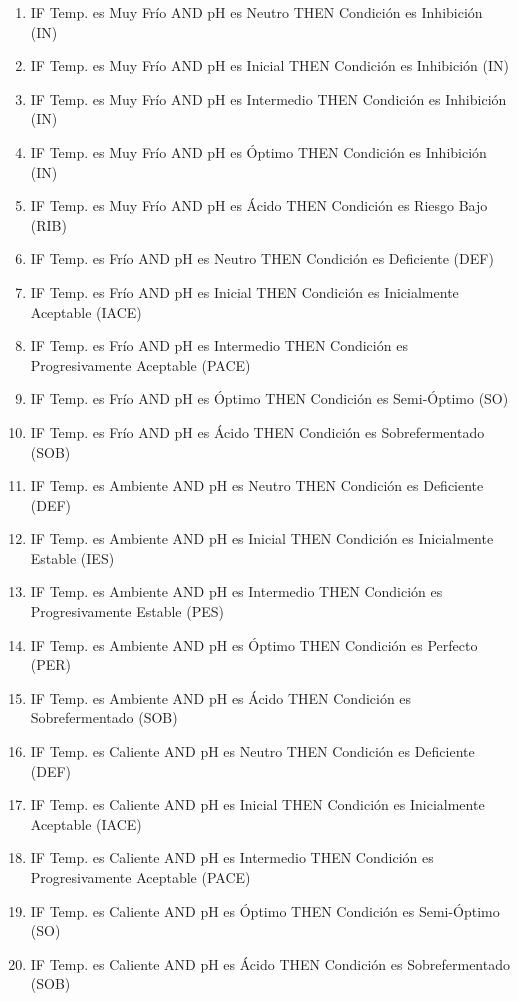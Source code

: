 \begin{enumerate}

\item IF Temp. es Muy Frío AND pH es Neutro THEN Condición es Inhibición (IN)
\item IF Temp. es Muy Frío AND pH es Inicial THEN Condición es Inhibición (IN)
\item IF Temp. es Muy Frío AND pH es Intermedio THEN Condición es Inhibición (IN)
\item IF Temp. es Muy Frío AND pH es Óptimo THEN Condición es Inhibición (IN)
\item IF Temp. es Muy Frío AND pH es Ácido THEN Condición es Riesgo Bajo (RIB)

\item IF Temp. es Frío AND pH es Neutro THEN Condición es Deficiente (DEF)
\item IF Temp. es Frío AND pH es Inicial THEN Condición es Inicialmente Aceptable (IACE)
\item IF Temp. es Frío AND pH es Intermedio THEN Condición es Progresivamente Aceptable (PACE)
\item IF Temp. es Frío AND pH es Óptimo THEN Condición es Semi-Óptimo (SO)
\item IF Temp. es Frío AND pH es Ácido THEN Condición es Sobrefermentado (SOB)

\item IF Temp. es Ambiente AND pH es Neutro THEN Condición es Deficiente (DEF)
\item IF Temp. es Ambiente AND pH es Inicial THEN Condición es Inicialmente Estable (IES)
\item IF Temp. es Ambiente AND pH es Intermedio THEN Condición es Progresivamente Estable (PES)
\item IF Temp. es Ambiente AND pH es Óptimo THEN Condición es Perfecto (PER)
\item IF Temp. es Ambiente AND pH es Ácido THEN Condición es Sobrefermentado (SOB)

\item IF Temp. es Caliente AND pH es Neutro THEN Condición es Deficiente (DEF)
\item IF Temp. es Caliente AND pH es Inicial THEN Condición es Inicialmente Aceptable (IACE)
\item IF Temp. es Caliente AND pH es Intermedio THEN Condición es Progresivamente Aceptable (PACE)
\item IF Temp. es Caliente AND pH es Óptimo THEN Condición es Semi-Óptimo (SO)
\item IF Temp. es Caliente AND pH es Ácido THEN Condición es Sobrefermentado (SOB)


\end{enumerate}
